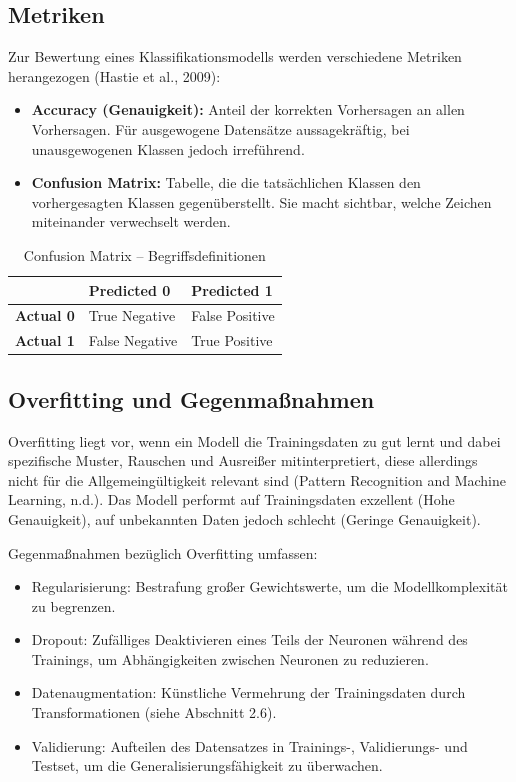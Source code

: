 \subsection{Metriken}

Zur Bewertung eines Klassifikationsmodells werden verschiedene Metriken herangezogen (Hastie et al., 2009):

\begin{itemize}
    \item \textbf{Accuracy (Genauigkeit):} Anteil der korrekten Vorhersagen an allen Vorhersagen. Für ausgewogene Datensätze aussagekräftig, bei unausgewogenen Klassen jedoch irreführend.
    \item \textbf{Confusion Matrix:} Tabelle, die die tatsächlichen Klassen den vorhergesagten Klassen gegenüberstellt. Sie macht sichtbar, welche Zeichen miteinander verwechselt werden.
\end{itemize}

\begin{table}[htbp]
    \centering
    \caption{Confusion Matrix -- Begriffsdefinitionen}
    \label{tab:confusion-matrix-definition}
    \begin{tabular}{|l|l|l|}
        \hline
        & \textbf{Predicted 0} & \textbf{Predicted 1} \\
        \hline
        \textbf{Actual 0} & True Negative & False Positive \\
        \hline
        \textbf{Actual 1} & False Negative & True Positive \\
        \hline
    \end{tabular}
\end{table}


\subsection{Overfitting und Gegenmaßnahmen}

Overfitting liegt vor, wenn ein Modell die Trainingsdaten zu gut lernt und dabei spezifische Muster, Rauschen und Ausreißer mitinterpretiert, diese allerdings nicht für die Allgemeingültigkeit relevant sind (Pattern Recognition and Machine Learning, n.d.). Das Modell performt auf Trainingsdaten exzellent (Hohe Genauigkeit), auf unbekannten Daten jedoch schlecht (Geringe Genauigkeit).

Gegenmaßnahmen bezüglich Overfitting umfassen:

\begin{itemize}
    \item Regularisierung: Bestrafung großer Gewichtswerte, um die Modellkomplexität zu begrenzen.
    \item Dropout: Zufälliges Deaktivieren eines Teils der Neuronen während des Trainings, um Abhängigkeiten zwischen Neuronen zu reduzieren.
    \item Datenaugmentation: Künstliche Vermehrung der Trainingsdaten durch Transformationen (siehe Abschnitt 2.6).
    \item Validierung: Aufteilen des Datensatzes in Trainings-, Validierungs- und Testset, um die Generalisierungsfähigkeit zu überwachen.
\end{itemize}

